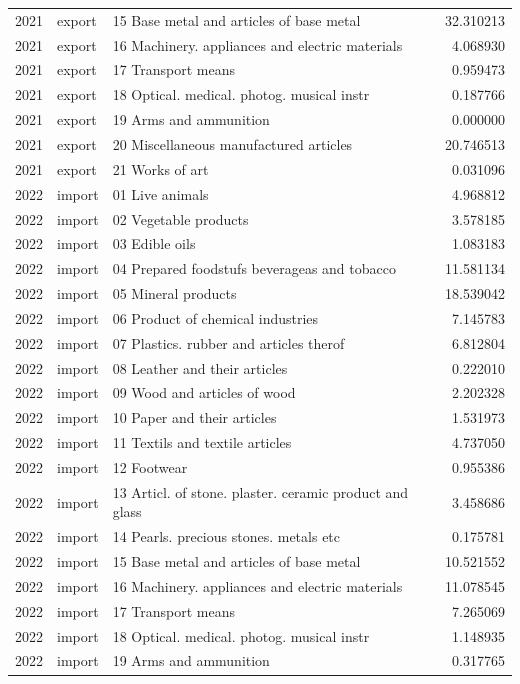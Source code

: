 \begin{tabular}{rllr}
2021 & export & 15 Base metal and articles of base metal & 32.310213 \\
2021 & export & 16 Machinery. appliances and electric materials & 4.068930 \\
2021 & export & 17 Transport means & 0.959473 \\
2021 & export & 18 Optical. medical. photog. musical instr & 0.187766 \\
2021 & export & 19 Arms and ammunition & 0.000000 \\
2021 & export & 20 Miscellaneous manufactured articles & 20.746513 \\
2021 & export & 21 Works of art & 0.031096 \\
2022 & import & 01 Live animals & 4.968812 \\
2022 & import & 02 Vegetable products & 3.578185 \\
2022 & import & 03 Edible oils & 1.083183 \\
2022 & import & 04 Prepared foodstufs beverageas and tobacco & 11.581134 \\
2022 & import & 05 Mineral products & 18.539042 \\
2022 & import & 06 Product of chemical industries & 7.145783 \\
2022 & import & 07 Plastics. rubber and articles therof & 6.812804 \\
2022 & import & 08 Leather and their articles & 0.222010 \\
2022 & import & 09 Wood and articles of wood & 2.202328 \\
2022 & import & 10 Paper and their articles & 1.531973 \\
2022 & import & 11 Textils and textile articles & 4.737050 \\
2022 & import & 12 Footwear & 0.955386 \\
2022 & import & 13 Articl. of stone. plaster. ceramic product and glass & 3.458686 \\
2022 & import & 14 Pearls. precious stones. metals etc & 0.175781 \\
2022 & import & 15 Base metal and articles of base metal & 10.521552 \\
2022 & import & 16 Machinery. appliances and electric materials & 11.078545 \\
2022 & import & 17 Transport means & 7.265069 \\
2022 & import & 18 Optical. medical. photog. musical instr & 1.148935 \\
2022 & import & 19 Arms and ammunition & 0.317765 \\

\end{tabular}
